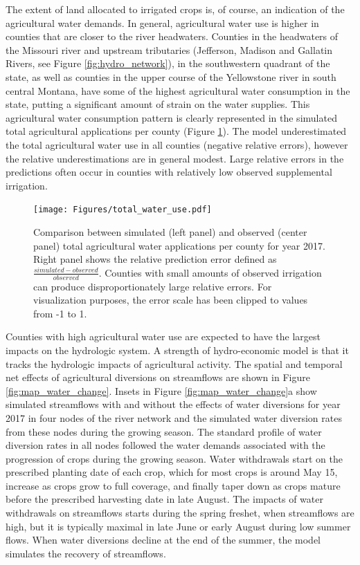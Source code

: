  The extent of land allocated to irrigated crops is, of course, an indication of the agricultural water demands. In general, agricultural water use is higher in counties that are closer to the river headwaters. Counties in the headwaters of the Missouri river and upstream tributaries (Jefferson, Madison and Gallatin Rivers, see Figure \ref{fig:hydro_network}), in the southwestern quadrant of the state, as well as counties in the upper course of the Yellowstone river in south central Montana, have some of the highest agricultural water consumption in the state, putting a significant amount of strain on the water supplies. This agricultural water consumption pattern is clearly represented in the simulated total agricultural applications per county (Figure \ref{fig:total_water_map}). The model underestimated the total agricultural water use in all counties (negative relative errors), however the relative underestimations are in general modest. Large relative errors in the predictions often occur in counties with relatively low observed supplemental irrigation.    

\begin{figure}
\texttt{[image: Figures/total\_water\_use.pdf]}
\label{fig:total_water_map}
\caption{Comparison between simulated (left panel) and observed (center panel) total agricultural water applications per county for year 2017. Right panel shows the relative prediction error defined as $\frac{simulated - observed}{observed}$. Counties with small amounts of observed irrigation can produce disproportionately large relative errors. For visualization purposes, the error scale has been clipped to values from -1 to 1. }
\end{figure}

Counties with high agricultural water use are expected to have the largest impacts on the hydrologic system. A strength of hydro-economic model is that it tracks the hydrologic impacts of agricultural activity. The spatial and temporal net effects of agricultural diversions on streamflows are shown in Figure \ref{fig:map_water_change}. Insets in Figure \ref{fig:map_water_change}a show simulated streamflows with and without the effects of water diversions for year 2017 in four nodes of the river network and the simulated water diversion rates from these nodes during the growing season. The standard profile of water diversion rates in all nodes followed the water demands associated with the progression of crops during the growing season. Water withdrawals start on the prescribed planting date of each crop, which for most crops is around May 15, increase as crops grow to full coverage, and finally taper down as crops mature before the prescribed harvesting date in late August. The impacts of water withdrawals on streamflows starts during the spring freshet, when streamflows are high, but it is typically maximal in late June or early August during low summer flows. When water diversions decline at the end of the summer, the model simulates the recovery of streamflows. 

